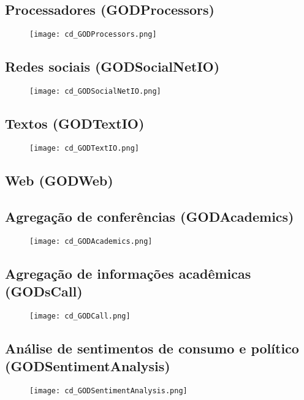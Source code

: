 \subsection{Processadores (GODProcessors)}
\begin{figure}[H]
\centering
\texttt{[image: cd\_GODProcessors.png]}
\label{fig:cd-godprocessors}
\end{figure}

\subsection{Redes sociais (GODSocialNetIO)}
\begin{figure}[H]
\centering
\texttt{[image: cd\_GODSocialNetIO.png]}
\label{fig:cd-godsocialnetio}
\end{figure}

\subsection{Textos (GODTextIO)}
\begin{figure}[H]
\centering
\texttt{[image: cd\_GODTextIO.png]}
\label{fig:cd-godtextio}
\end{figure}

\subsection{Web (GODWeb)}

\subsection{Agregação de conferências (GODAcademics)}
\begin{figure}[H]
\centering
\texttt{[image: cd\_GODAcademics.png]}
\label{fig:cd-godacademics}
\end{figure}

\subsection{Agregação de informações acadêmicas (GODsCall)}
\begin{figure}[H]
\centering
\texttt{[image: cd\_GODCall.png]}
\label{fig:cd-godcall}
\end{figure}

\subsection{Análise de sentimentos de consumo e político (GODSentimentAnalysis)}
\begin{figure}[H]
\centering
\texttt{[image: cd\_GODSentimentAnalysis.png]}
\label{fig:cd-godsentimentanalysis}
\end{figure}

